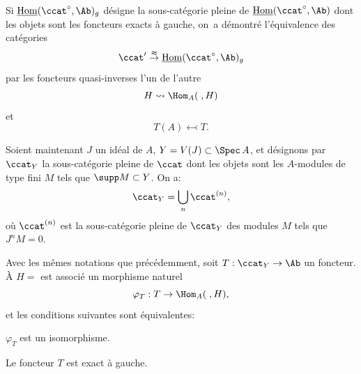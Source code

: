 Si $\mathop{\underline{\mathrm{Hom}}}\nolimits (\ccat^{\circ}, \Ab)_{g}$ d\'esigne la sous-cat\'egorie pleine de $\mathop{\underline{\mathrm{Hom}}}\nolimits (\ccat^{\circ}, \Ab)$ dont les objets sont les foncteurs exacts \`a gauche, on~a d\'emontr\'e l'\'equivalence des cat\'egories
\[
\ccat' \overset{\thickapprox}{\to} \mathop{\underline{\mathrm{Hom}}}\nolimits (\ccat^{\circ}, \Ab)_{g}
\]
par les foncteurs quasi-inverses l'un de l'autre
\[
H \rightsquigarrow\Hom_{A}(\;, H)
\]
et
\[
T(A) \leftarrowtail T.
\]

Soient maintenant $J$ un id\'eal de $A$, $Y=V(J)\subset \Spec\, A$, et d\'esignons par $\ccat_{Y}$ la sous-cat\'egorie pleine de $\ccat$ dont les objets sont les $A$-modules de type fini $M$ tels que $\supp M\subset Y$. On a:
\[
\ccat_{Y}=\bigcup_{n}\ccat^{(n)},
\]
o\`u $\ccat^{(n)}$ est la sous-cat\'egorie pleine de $\ccat_{Y}$ des modules $M$ tels que $J^{n}M=0$.

\begin{proposition} \label{IV.1.3}
Avec les m\^emes notations que pr\'ec\'edemment, soit $T:\ccat_{Y}\to \Ab$ un foncteur. \`A $H=$ est associ\'e un morphisme naturel
\[
\varphi_{T}: T\to \Hom_{A}(\;, H),
\]
et les conditions suivantes sont \'equivalentes:
\begin{enumeratei}
\item
$\varphi_{T}$ est un isomorphisme.

\item
Le foncteur $T$ est exact \`a gauche.
\end{enumeratei}
\end{proposition}

